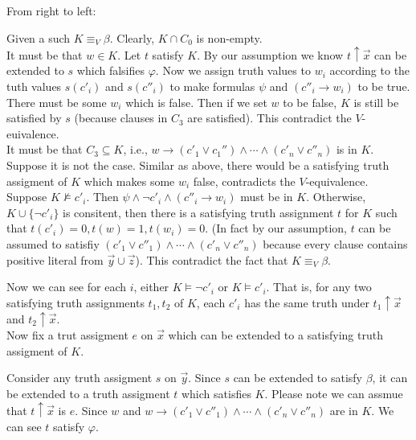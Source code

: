 \documentclass[12pt]{article}
\begin{document}
\color{red} From right to left:\color{black}

Given a such $K\equiv_V \beta$. 
Clearly, $K\cap C_0$ is non-empty.\\



It must be that $w\in K$. 
Let $t$ satisfy $K$. 
By our assumption we know $t\uparrow\vec{x}$ can be extended to $s$ which falsifies $\varphi$. Now we assign truth values to $w_i$ according to the tuth values $s(c'_i)$ and $s(c''_i)$ to make formulas $\psi$ and  $(c''_i\rightarrow w_i)$ to be true. There  must be some $w_i$ which is false. Then if we set $w$ to be false, $K$ is still be satisfied by $s$ (because clauses in $C_3$ are satisfied). This contradict the $V$-euivalence.\\

It must be that $C_3\subseteq K$, i.e., $w\rightarrow (c'_1\vee c_1'')\wedge\cdots\wedge (c'_n\vee c''_n)$ is in $K$. Suppose it is not the case. Similar as above, there would be a satisfying truth assigment of $K$ which makes some $w_i$ false, contradicts the $V$-equivalence. \\


Suppose $K\not\models c'_i$. Then $\psi\wedge\neg c'_i \wedge (c''_i\rightarrow w_i)$ must be in $K$. 
Otherwise, $K\cup\{\neg c'_i\}$ is consitent,  then there is a satisfying truth assignment $t$ for $K$ such that $t(c'_i)=0, t(w)=1, t(w_i)=0$. (In fact by our assumption, $t$ can be assumed to satisfiy $(c'_1\vee c''_1)\wedge\cdots\wedge (c'_n\vee c''_n)$ because every clause contains positive literal from $\vec{y}\cup\vec{z}$). This contradict the fact that $K\equiv_V\beta$.


Now we can see for each $i$, either $K\models \neg c'_i$ or $K\models c'_i$. 
That is, for any two satisfying truth assignments $t_1, t_2$ of $K$, each $c'_i$ has the same truth under $t_1\uparrow \vec{x}$ and $t_2\uparrow\vec{x}$.  \\





Now fix a trut assigment $e$ on $\vec{x}$ which can be extended to a satisfying truth assigment of $K$. 

Consider any truth assigment $s$ on $\vec{y}$. Since $s$ can be extended to satisfy $\beta$, it can be extended to a truth assigment $t$ which satisfies $K$. Please note we can assmue that $t\uparrow\vec{x}$ is $e$. 
Since $w$ and $w\rightarrow (c'_1\vee c''_1)\wedge\cdots\wedge (c'_n\vee c''_n)$ are in $K$. We can see $t$ satisfy $\varphi$. 
\end{document}
